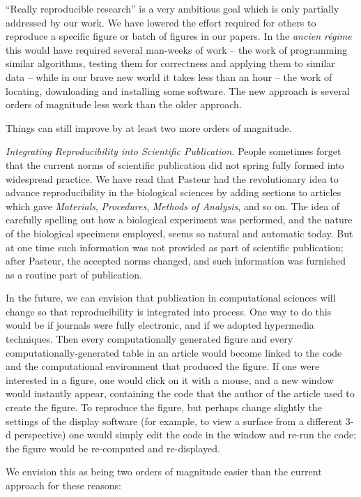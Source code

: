 ``Really reproducible research'' is  a very ambitious goal
which is only partially addressed by our work.  
We have lowered the effort required for 
others to reproduce a specific figure or batch of figures 
in our papers.  In the {\it ancien r\'egime} this would have required
several man-weeks of work -- the work of programming similar algorithms,
testing them for correctness and applying them to similar data --
while in our brave new world it takes less than an hour -- the work of locating,
downloading and installing some software.
The new approach is several orders of magnitude less work than the older
approach.

Things can still improve by at least two more orders of magnitude.

{\it Integrating Reproducibility into Scientific Publication.} 
People sometimes forget
that the current norms of scientific publication did not spring fully formed into
widespread practice.  We have read that Pasteur had the revolutionary idea to advance
reproducibility in the biological sciences by adding sections to articles which gave
{\it Materials}, {\it Procedures}, {\it Methods of Analysis}, and so on.  
The idea of carefully spelling out how a biological experiment
was performed, and the nature of the biological specimens employed,
seems so natural and automatic today.  
But at one time such information was not
provided as part of scientific publication; after Pasteur,
the accepted norms changed, and such information
was furnished as a routine part of publication.

In the future, we can envision that publication in computational
sciences will change so that reproducibility is
integrated into process.  One way to do this would
be if journals were fully electronic, and if we adopted
hypermedia techniques.  Then every
computationally generated figure and every computationally-generated
table in an article would become linked to the code and the computational
environment that produced the figure.  If one were interested
in a figure, one would click on it with a mouse, and
a new window would instantly appear, containing the code
that the author of the article used to create the figure.
To reproduce the figure, but perhaps change slightly the
settings of the display software (for example, to view a surface
from a different 3-d perspective) one would simply edit the code in the
window and re-run the code; the figure would be re-computed and re-displayed.

We envision this as being two orders of magnitude easier than the
current approach for these reasons:

